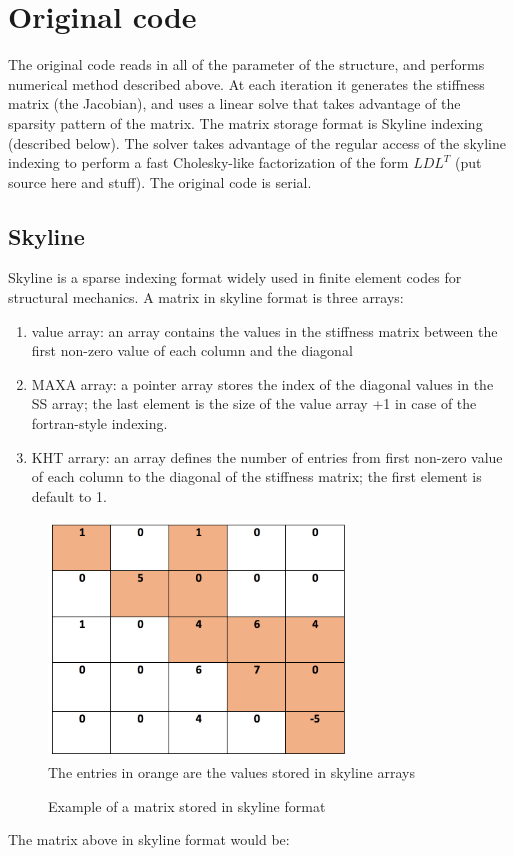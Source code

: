 \documentclass[11pt]{article}
\begin{document}
\section{Original code}\label{sec:originalCode}
The original code reads in all of the parameter of the structure, and performs numerical method described above. At each iteration it generates the stiffness matrix (the Jacobian), and uses a linear solve that takes advantage of the sparsity pattern of the matrix. The matrix storage format is Skyline indexing (described below). The solver takes advantage of the regular access of the skyline indexing to perform a fast Cholesky-like factorization of the form $LDL^T$ (put source here and stuff). The original code is serial.


\subsection{Skyline}
Skyline is a sparse indexing format widely used in finite element codes for structural mechanics. A matrix in skyline format is three arrays: 
\begin{enumerate}

\item value array: an array contains the values in the stiffness matrix between the first non-zero value of each column and the diagonal
\item MAXA array: a  pointer array stores the index of the diagonal values in the SS array; the last element is the size of the value array +1 in case of the fortran-style indexing.
\item KHT arrary: an array defines the number of entries from first non-zero value of each column to the diagonal of the stiffness matrix; the first element is default to 1. 
\end{enumerate}

\begin{figure}[h]
\begin{center}

\caption{Example of a matrix stored in skyline format}
\includegraphics[width=8cm]{skyline}
\label{fig:skyline}
\\
The entries in orange are the values stored in skyline arrays
\end{center}

\end{figure}
The matrix above in skyline format would be:
\end{document}
